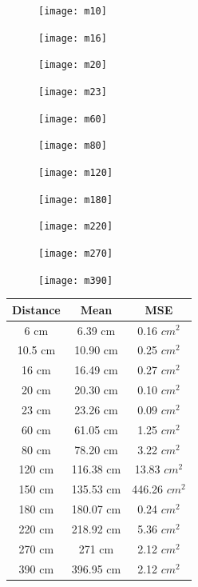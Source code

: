 \begin{figure}[H]
\texttt{[image: m10]}
\end{figure}
\begin{figure}[H]
\texttt{[image: m16]}
\end{figure}
\begin{figure}[H]
\texttt{[image: m20]}
\end{figure}
\begin{figure}[H]
\texttt{[image: m23]}
\end{figure}
\begin{figure}[H]
\texttt{[image: m60]}
\end{figure}
\begin{figure}[H]
\texttt{[image: m80]}
\end{figure}
\begin{figure}[H]
\texttt{[image: m120]}
\end{figure}
\begin{figure}[H]
\texttt{[image: m180]}
\end{figure}
\begin{figure}[H]
\texttt{[image: m220]}
\end{figure}
\begin{figure}[H]
\texttt{[image: m270]}
\end{figure}
\begin{figure}[H]
\texttt{[image: m390]}
\end{figure}
\begin{center}
 \begin{tabular}{| c | c | c |} 
 \hline
 Distance & Mean & MSE\\ [0.5ex] 
 \hline\hline
 6 cm & 6.39 cm & 0.16 $cm^2$\\ 
 \hline
 10.5 cm & 10.90 cm &  0.25 $cm^2$\\
 \hline
 16 cm & 16.49 cm &  0.27 $cm^2$\\
 \hline
 20 cm& 20.30 cm& 0.10 $cm^2$\\
 \hline
 23 cm& 23.26 cm & 0.09 $cm^2$\\
 \hline
 60 cm& 61.05 cm & 1.25 $cm^2$ \\
 \hline
 80 cm& 78.20 cm & 3.22 $cm^2$ \\
 \hline
 120 cm& 116.38 cm & 13.83 $cm^2$ \\
 \hline
 150 cm& 135.53 cm& 446.26 $cm^2$\\
 \hline
 180 cm& 180.07 cm&  0.24 $cm^2$\\
 \hline
 220 cm& 218.92 cm&  5.36 $cm^2$\\
 \hline
 270 cm& 271 cm & 2.12 $cm^2$\\
 \hline
 390 cm& 396.95 cm & 2.12 $cm^2$\\ [1ex] 
 \hline
\end{tabular}
\end{center}
\newpage
